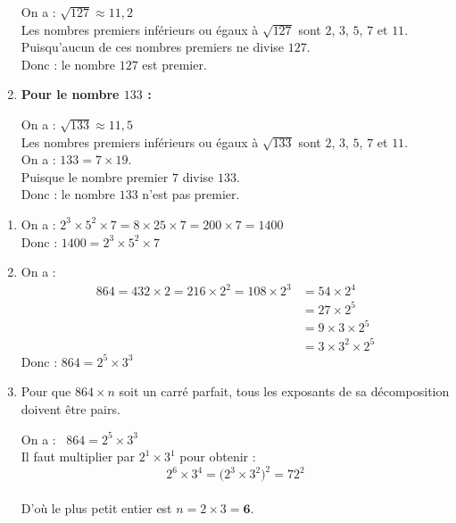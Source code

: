\documentclass[10pt, a4paper]{article}
\begin{document}
\begin{multicols*}{2}
\begin{Solution}[APPLICATION][8]
\begin{enumerate}[leftmargin=*,itemsep=0.5pt]
    On a : $\sqrt{127} \approx 11,2$ \\
    Les nombres premiers inférieurs ou égaux à $\sqrt{127}$ sont $2$, $3$, $5$, $7$ et $11$. \\
    Puisqu'aucun de ces nombres premiers ne divise $127$. \\
    Donc : \quad le nombre $127$ est premier.

    \item \textbf{Pour le nombre $133$ :}

    On a : $\sqrt{133} \approx 11,5$ \\
    Les nombres premiers inférieurs ou égaux à $\sqrt{133}$ sont $2$, $3$, $5$, $7$ et $11$. \\
    On a : $133 = 7 \times 19$. \\
    Puisque le nombre premier $7$ divise $133$. \\
    Donc : \quad le nombre $133$ n'est pas premier.
\end{enumerate}
\end{Solution}

\begin{Solution}[ACTIVITÉ][3]
\begin{enumerate}[leftmargin=*,itemsep=0.5pt]
    \item On a :
        $2^3 \times 5^2 \times 7 = 8 \times 25 \times 7
        = 200 \times 7
        = 1400$ \\
    Donc : \quad $1400 = 2^3 \times 5^2 \times 7$

    \item On a :
    \begin{align*}
        864 = 432 \times 2
            = 216 \times 2^2
            = 108 \times 2^3
            &= 54 \times 2^4 \\
            &= 27 \times 2^5 \\
            &= 9  \times 3 \times 2^5 \\
            &= 3  \times 3^2 \times 2^5
    \end{align*}
    Donc : \quad $864 = 2^5 \times 3^3$

    \item Pour que $864 \times n$ soit un carré parfait, tous les exposants de sa décomposition doivent être pairs.

On a :~ $864 = 2^5 \times 3^3$ \\
Il faut multiplier par $2^1 \times 3^1$ pour obtenir :
$$2^6 \times 3^4 = \big(2^3 \times 3^2\big)^2 = 72^2$$ \\
D'où le plus petit entier est $n = 2 \times 3 = \mathbf{6}$.
\end{enumerate}
\end{Solution}


\end{multicols*}
\end{document}
